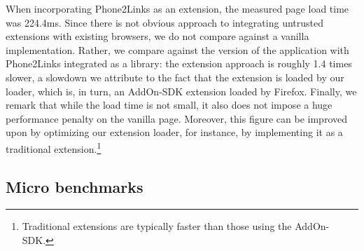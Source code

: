 When incorporating Phone2Links as an extension, the measured page load
time was 224.4ms.
%
Since there is not obvious approach to integrating untrusted
extensions with existing browsers, we do not compare against a vanilla
implementation.
%
Rather, we compare against the version of the application with
Phone2Links integrated as a library: the extension approach is
roughly 1.4 times slower, a slowdown we attribute to the fact that the
extension is loaded by our loader, which is, in turn, an AddOn-SDK
extension loaded by Firefox.
%
Finally, we remark that while the load time is not small, it also does
not impose a huge performance penalty on the vanilla page.
%
Moreover, this figure can be improved upon by optimizing our
extension loader, for instance, by implementing it as a traditional
extension.\footnote{
  Traditional extensions are typically faster than those using the
  AddOn-SDK.
}




\subsection{Micro benchmarks}
\label{sec:eval:micro}

\newcommand*\rot{\rotatebox{90}}

